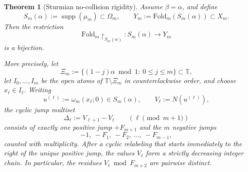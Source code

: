 \documentclass[11pt,letterpaper]{article}
\numberwithin{equation}{section}
\theoremstyle{plain}
\newtheorem{theorem}{Theorem}[section]
\theoremstyle{definition}
\theoremstyle{remark}
\newcommand{\TT}{\mathbb{T}}
\newcommand{\Fold}{\mathrm{Fold}}
\DeclareMathOperator{\supp}{supp}
\begin{document}
\begin{theorem}[Sturmian no-collision rigidity]\label{thm:sturmian-no-collision-rigidity}
Assume \(\beta=\alpha\), and define
\[
S_m(\alpha):=\supp(\mu_m)\subset\Omega_m,
\qquad
Y_m:=\Fold_m(S_m(\alpha))\subset X_m.
\]
Then the restriction
\[
\Fold_m\!\upharpoonright_{S_m(\alpha)}:S_m(\alpha)\to Y_m
\]
is a bijection.

More precisely, let
\[
\Xi_m:=\{(1-j)\alpha \bmod 1:\ 0\le j\le m\}\subset\TT,
\]
let \(I_0,\dots,I_m\) be the open atoms of \(\TT\setminus \Xi_m\) in
counterclockwise order, and choose \(x_\ell\in I_\ell\). Writing
\[
u^{(\ell)}:=\omega_m(x_\ell;0)\in S_m(\alpha),
\qquad
V_\ell:=N(u^{(\ell)}),
\]
the cyclic jump multiset
\[
\Delta_\ell:=V_{\ell+1}-V_\ell
\qquad (\ell\!\!\!\!\pmod{m+1})
\]
consists of exactly one positive jump \(+F_{m+1}\) and the \(m\) negative
jumps
\[
-1,\ -F_1,\ -F_2,\ \dots,\ -F_{m-1},
\]
counted with multiplicity. After a cyclic relabeling that starts immediately to
the right of the unique positive jump, the values \(V_\ell\) form a strictly
decreasing integer chain. In particular, the residues \(V_\ell\bmod F_{m+2}\)
are pairwise distinct.
\end{theorem}
\end{document}
